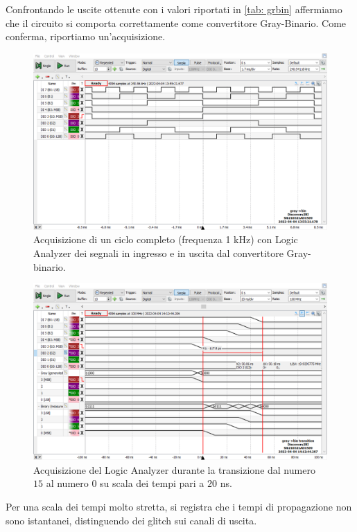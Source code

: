 \documentclass[10pt, a4paper, italian]{article}
\begin{document}
Confrontando le uscite ottenute con i valori riportati in \cref{tab: grbin} affermiamo che il circuito si comporta correttamente come convertitore Gray-Binario. Come conferma, riportiamo un'acquisizione.\\
\begin{figure}[htbp]
    \centering
    \includegraphics[width=\textwidth]{graybin}
    \caption{Acquisizione di un ciclo completo (frequenza 1 kHz) con Logic
    Analyzer dei segnali in ingresso e in uscita dal convertitore Gray-binario.}
\end{figure}
\begin{figure}[htbp]
    \centering
    \includegraphics[width=\textwidth]{gray20ns}
    \caption{Acquisizione del Logic Analyzer durante la transizione dal numero $15$ al numero $0$ su scala dei tempi pari a $20$ ns.}
\end{figure}
Per una scala dei tempi molto stretta, si registra che i tempi di propagazione non sono istantanei, distinguendo dei glitch sui canali di uscita. \\ 
\end{document}
